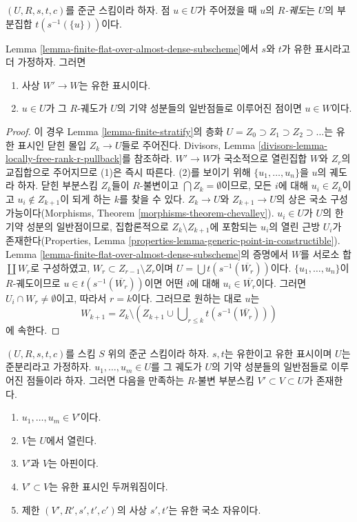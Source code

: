 \noindent
$(U, R, s, t, c)$를 준군 스킴이라 하자. 점 $u \in U$가 주어졌을 때
$u$의 {\it $R$-궤도}는 $U$의 부분집합 $t(s^{-1}(\{u\}))$이다.

\begin{lemma}
\label{lemma-finite-flat-over-almost-dense-subscheme-addendum}
Lemma \ref{lemma-finite-flat-over-almost-dense-subscheme}에서 $s$와 $t$가
유한 표시라고 더 가정하자. 그러면
\begin{enumerate}
\item 사상 $W' \to W$는 유한 표시이다.
\item $u \in U$가 그 $R$-궤도가 $U$의 기약 성분들의 일반점들로 이루어진
점이면 $u \in W$이다.
\end{enumerate}
\end{lemma}

\begin{proof}
이 경우 Lemma \ref{lemma-finite-stratify}의 층화
$U = Z_0 \supset Z_1 \supset Z_2 \supset \ldots$는 유한 표시인 닫힌 몰입
$Z_k \to U$들로 주어진다. Divisors, Lemma
\ref{divisors-lemma-locally-free-rank-r-pullback}를 참조하라.
$W' \to W$가 국소적으로 열린집합 $W$와 $Z_r$의 교집합으로 주어지므로
(1)은 즉시 따른다. (2)를 보이기 위해 $\{u_1, \ldots, u_n\}$을 $u$의
궤도라 하자. 닫힌 부분스킴 $Z_k$들이 $R$-불변이고
$\bigcap Z_k = \emptyset$이므로, 모든 $i$에 대해 $u_i \in Z_k$이고
$u_i \not \in Z_{k + 1}$이 되게 하는 $k$를 찾을 수 있다.
$Z_k \to U$와 $Z_{k + 1} \to U$의 상은 국소 구성가능이다(Morphisms,
Theorem \ref{morphisms-theorem-chevalley}). $u_i \in U$가 $U$의 한 기약 성분의
일반점이므로, 집합론적으로 $Z_k \setminus Z_{k + 1}$에 포함되는 $u_i$의
열린 근방 $U_i$가 존재한다(Properties, Lemma
\ref{properties-lemma-generic-point-in-constructible}). Lemma
\ref{lemma-finite-flat-over-almost-dense-subscheme}의 증명에서 $W$를 서로소 합
$\coprod W_r$로 구성하였고, $W_r \subset Z_{r - 1} \setminus Z_r$이며
$U = \bigcup t(s^{-1}(\overline{W_r}))$이다. $\{u_1, \ldots, u_n\}$이
$R$-궤도이므로 $u \in t(s^{-1}(\overline{W_r}))$이면 어떤 $i$에 대해
$u_i \in \overline{W_r}$이다. 그러면 $U_i \cap W_r \not = \emptyset$이고,
따라서 $r = k$이다. 그러므로 원하는 대로 $u$는
$$
W_{k + 1} = Z_k \setminus
\left(
Z_{k + 1} \cup \bigcup\nolimits_{r \leq k} t(s^{-1}(\overline{W_r}))
\right)
$$
에 속한다.
\end{proof}

\begin{lemma}
\label{lemma-invariant-affine-open-around-generic-point}
$(U, R, s, t, c)$를 스킴 $S$ 위의 준군 스킴이라 하자. $s, t$는 유한이고
유한 표시이며 $U$는 준분리라고 가정하자. $u_1, \ldots, u_m \in U$를
그 궤도가 $U$의 기약 성분들의 일반점들로 이루어진 점들이라 하자.
그러면 다음을 만족하는 $R$-불변 부분스킴 $V' \subset V \subset U$가 존재한다.
\begin{enumerate}
\item $u_1, \ldots, u_m \in V'$이다.
\item $V$는 $U$에서 열린다.
\item $V'$과 $V$는 아핀이다.
\item $V' \subset V$는 유한 표시인 두꺼워짐이다.
\item 제한 $(V', R', s', t', c')$의 사상 $s', t'$는 유한 국소 자유이다.
\end{enumerate}
\end{lemma}

